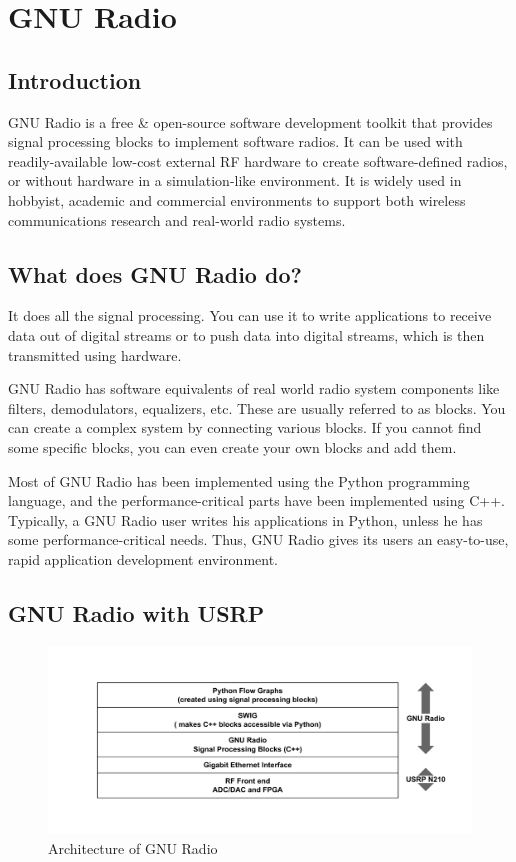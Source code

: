 \chapter{GNU Radio}

\section{Introduction}
GNU Radio is a free \& open-source software development toolkit that provides signal processing blocks to implement software radios. It can be used with readily-available low-cost external RF hardware to create software-defined radios, or without hardware in a simulation-like environment. It is widely used in hobbyist, academic and commercial environments to support both wireless communications research and real-world radio systems.

\section{What does GNU Radio do?}
It does all the signal processing. You can use it to write applications to receive data out of digital streams or to push data into digital streams, which is then transmitted using hardware.

GNU Radio has software equivalents of real world radio system components like filters, demodulators, equalizers, etc. These are usually referred to as blocks. You can create a complex system by connecting various blocks. If you cannot find some specific blocks, you can even create your own blocks and add them.

Most of GNU Radio has been implemented using the Python programming language, and the performance-critical parts have been implemented using C++. Typically, a GNU Radio user writes his applications in Python, unless he has some performance-critical needs. Thus, GNU Radio gives its users an easy-to-use, rapid application development environment.

\section{GNU Radio with USRP}

\begin{figure}[h]
\centering
\includegraphics[width=1\textwidth]{gnuradio_architecture}
\caption{Architecture of GNU Radio}
\label{gnuradio_architecture}
\end{figure}

